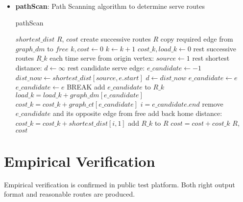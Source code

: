 \documentclass[conference,compsoc]{IEEEtran}
\renewcommand{\algorithmicrequire}{\textbf{Input:}}
\renewcommand{\algorithmicensure}{\textbf{Output:}}
\begin{document}
\begin{itemize}
   \item \textbf{pathScan}: Path Scanning algorithm to determine serve routes
     \begin{algorithm}[H]
     \caption{pathScan}
     \begin{algorithmic}[4]
     \renewcommand{\algorithmicrequire}{\textbf{Input:}}
     \renewcommand{\algorithmicensure}{\textbf{Output:}}
     \REQUIRE $shortest\_dist$
     \ENSURE  $R$, $cost$
     \STATE create successive routes $R$
     \STATE copy required edge from $graph\_dm$ to $free$ 
     \STATE $k, cost \leftarrow 0$
       \STATE $k \leftarrow k+1$
       \STATE $cost\_k, load\_k \leftarrow 0 $
       \STATE rest successive routes $R\_k$ each time 
       \STATE serve from origin vertex: $source \leftarrow 1$
         \STATE rest shortest distance: $d \leftarrow \infty$ 
         \STATE rest candidate serve edge: $e\_candidate \leftarrow -1$
               \STATE $dist\_now \leftarrow shortest\_dist[source, e.start]$
                 \STATE $d \leftarrow dist\_now$
                 \STATE $e\_candidate \leftarrow e$
                 \STATE $e\_candidate \leftarrow e$
               \ENDIF
            \ENDIF
         \ENDFOR
            \STATE BREAK
         \ENDIF
         \STATE add $e\_candidate$ to $R\_k$
         \STATE $load\_k = load\_k + graph\_dm[e\_candidate]$
         \STATE $cost\_k = cost\_k + graph\_ct[e\_candidate]$
         \STATE $i = e\_candidate.end$
         \STATE remove $e\_candidate$ and its opposite edge from free
       \ENDWHILE
       \STATE add back home distance: $cost\_k = cost\_k + shortest\_dist[i,1]$
       \STATE add $R\_k$ to $R$
       \STATE $cost = cost + cost\_k$
     \ENDWHILE
     \RETURN $R$, $cost$
     \end{algorithmic}
     \end{algorithm}


\end{itemize}


\section{Empirical Verification}
Empirical verification is confirmed in public test platform. Both right output
format and reasonable routes are produced.
\end{document}

